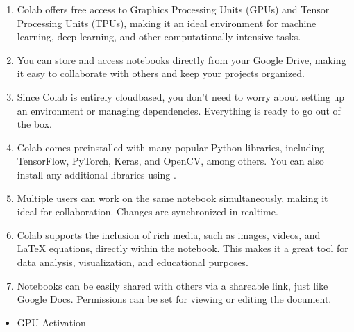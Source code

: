 \documentclass[letterpaper,11pt,english]{sphinxmanual}
\begin{document}
\begin{enumerate}
%
\item {} 
\sphinxAtStartPar
{}
Colab offers free access to Graphics Processing Units (GPUs) and Tensor Processing Units (TPUs), making it an ideal environment for machine learning, deep learning, and other computationally intensive tasks.

\item {} 
\sphinxAtStartPar
{}
You can store and access notebooks directly from your Google Drive, making it easy to collaborate with others and keep your projects organized.

\item {} 
\sphinxAtStartPar
{}
Since Colab is entirely cloud\sphinxhyphen{}based, you don’t need to worry about setting up an environment or managing dependencies. Everything is ready to go out of the box.

\item {} 
\sphinxAtStartPar
{}
Colab comes pre\sphinxhyphen{}installed with many popular Python libraries, including TensorFlow, PyTorch, Keras, and OpenCV, among others. You can also install any additional libraries using .

\item {} 
\sphinxAtStartPar
{}
Multiple users can work on the same notebook simultaneously, making it ideal for collaboration. Changes are synchronized in real\sphinxhyphen{}time.

\item {} 
\sphinxAtStartPar
{}
Colab supports the inclusion of rich media, such as images, videos, and LaTeX equations, directly within the notebook. This makes it a great tool for data analysis, visualization, and educational purposes.

\item {} 
\sphinxAtStartPar
{}
Notebooks can be easily shared with others via a shareable link, just like Google Docs. Permissions can be set for viewing or editing the document.

\end{enumerate}
\begin{itemize}
\item {} 
\sphinxAtStartPar
GPU Activation

\end{itemize}
\end{document}
